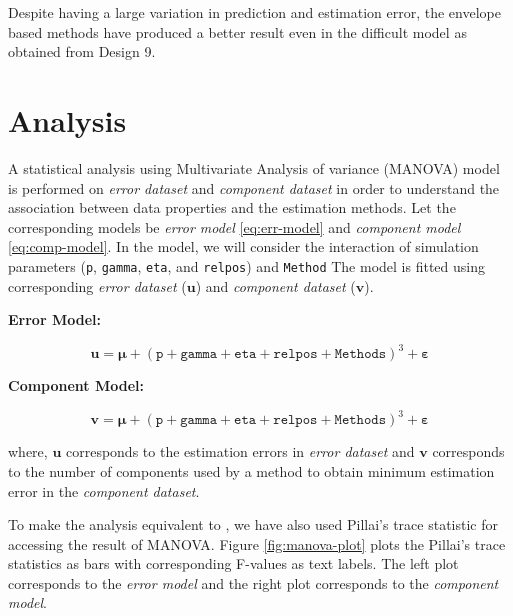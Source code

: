 \documentclass[12pt,3p,authoryear]{elsarticle}
\begin{document}
Despite having a large variation in prediction and estimation error, the
envelope based methods have produced a better result even in the
difficult model as obtained from Design 9.

\section{Analysis}\label{analysis}

A statistical analysis using Multivariate Analysis of variance (MANOVA)
model is performed on \emph{error dataset} and \emph{component dataset}
in order to understand the association between data properties and the
estimation methods. Let the corresponding models be \emph{error model}
\eqref{eq:err-model} and \emph{component model} \eqref{eq:comp-model}. In
the model, we will consider the interaction of simulation parameters
(\texttt{p}, \texttt{gamma}, \texttt{eta}, and \texttt{relpos}) and
\texttt{Method} The model is fitted using corresponding \emph{error
dataset} (\(\mathbf{u}\)) and \emph{component dataset} (\(\mathbf{v}\)).

\textbf{Error Model:}

\begin{equation}
  \mathbf{u} = \boldsymbol{\mu} +
  (\texttt{p} + \texttt{gamma} + \texttt{eta} +
    \texttt{relpos} + \texttt{Methods})^3 +
    \boldsymbol{\varepsilon}
  \label{eq:err-model}
\end{equation}

\textbf{Component Model:}

\begin{equation}
  \mathbf{v} = \boldsymbol{\mu} +
  (\texttt{p} + \texttt{gamma} + \texttt{eta} +
    \texttt{relpos} + \texttt{Methods})^3 +
    \boldsymbol{\varepsilon}
  \label{eq:comp-model}
\end{equation}

where, \(\mathbf{u}\) corresponds to the estimation errors in
\emph{error dataset} and \(\mathbf{v}\) corresponds to the number of
components used by a method to obtain minimum estimation error in the
\emph{component dataset}.

To make the analysis equivalent to \citet{rimal2019pred}, we have also
used Pillai's trace statistic for accessing the result of MANOVA. Figure
\ref{fig:manova-plot} plots the Pillai's trace statistics as bars with
corresponding F-values as text labels. The left plot corresponds to the
\emph{error model} and the right plot corresponds to the \emph{component
model}.
\end{document}

